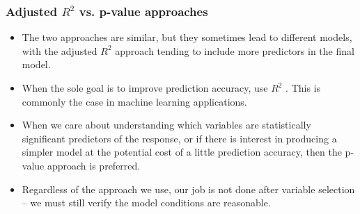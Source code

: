 
\begin{frame}
\frametitle{Adjusted $R^2$ vs. p-value approaches}

\begin{itemize}

\item The two approaches are similar, but they sometimes lead to different models, with the adjusted $R^2$ approach tending to include more predictors in the final model.

\item When the sole goal is to improve prediction accuracy, use $R^2$ . This is commonly the case in machine learning applications.

\item When we care about understanding which variables are statistically significant predictors of the response, or if there is interest in producing a simpler model at the potential cost of a little prediction accuracy, then the p-value approach is preferred.

\item Regardless of the approach we use, our job is not done after variable selection -- we must still verify the model conditions are reasonable.

\end{itemize}

\end{frame}

